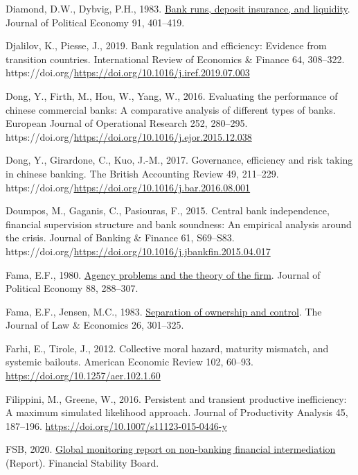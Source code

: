 \documentclass[
  12pt,
  a4paper,
  DIV=11,
  numbers=noendperiod]{scrreprt}
\newlength{\cslhangindent}
\newenvironment{CSLReferences}[2] %
 {\begin{list}{}{%
  \setlength{\itemindent}{0pt}
  \setlength{\leftmargin}{0pt}
  \setlength{\parsep}{0pt}
  \ifodd #1
   \setlength{\leftmargin}{\cslhangindent}
   \setlength{\itemindent}{-1\cslhangindent}
  \fi
  \setlength{\itemsep}{#2\baselineskip}}}
 {\end{list}}
\begin{document}
\begin{CSLReferences}{1}{0}
Diamond, D.W., Dybvig, P.H., 1983.
\href{http://www.jstor.org/stable/1837095}{Bank runs, deposit insurance,
and liquidity}. Journal of Political Economy 91, 401--419.

Djalilov, K., Piesse, J., 2019. Bank regulation and efficiency: Evidence
from transition countries. International Review of Economics \& Finance
64, 308--322.
https://doi.org/\url{https://doi.org/10.1016/j.iref.2019.07.003}

Dong, Y., Firth, M., Hou, W., Yang, W., 2016. Evaluating the performance
of chinese commercial banks: A comparative analysis of different types
of banks. European Journal of Operational Research 252, 280--295.
https://doi.org/\url{https://doi.org/10.1016/j.ejor.2015.12.038}

Dong, Y., Girardone, C., Kuo, J.-M., 2017. Governance, efficiency and
risk taking in chinese banking. The British Accounting Review 49,
211--229.
https://doi.org/\url{https://doi.org/10.1016/j.bar.2016.08.001}

Doumpos, M., Gaganis, C., Pasiouras, F., 2015. Central bank
independence, financial supervision structure and bank soundness: An
empirical analysis around the crisis. Journal of Banking \& Finance 61,
S69--S83.
https://doi.org/\url{https://doi.org/10.1016/j.jbankfin.2015.04.017}

Fama, E.F., 1980. \href{http://www.jstor.org/stable/1837292}{Agency
problems and the theory of the firm}. Journal of Political Economy 88,
288--307.

Fama, E.F., Jensen, M.C., 1983.
\href{http://www.jstor.org/stable/725104}{Separation of ownership and
control}. The Journal of Law \& Economics 26, 301--325.

Farhi, E., Tirole, J., 2012. Collective moral hazard, maturity mismatch,
and systemic bailouts. American Economic Review 102, 60--93.
\url{https://doi.org/10.1257/aer.102.1.60}

Filippini, M., Greene, W., 2016. Persistent and transient productive
inefficiency: A maximum simulated likelihood approach. Journal of
Productivity Analysis 45, 187--196.
\url{https://doi.org/10.1007/s11123-015-0446-y}

FSB, 2020.
\href{https://www.fsb.org/wp-content/uploads/P161220.pdf}{Global
monitoring report on non-banking financial intermediation} (Report).
Financial Stability Board.


\end{CSLReferences}
\end{document}
